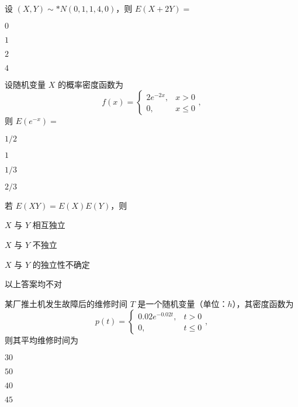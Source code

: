 \documentclass{exam-zh}
\begin{document}
\begin{question}
  设 $(X, Y) \sim* N(0, 1, 1, 4, 0)$，则 $E(X+2Y) =$ \paren[C]
  \begin{choices}
    \item $0$
    \item $1$
    \item $2$
    \item $4$
  \end{choices}
\end{question}

\begin{question}
  设随机变量 $X$ 的概率密度函数为
  $$
  f(x) = 
  \begin{cases} 
  2e^{-2x}, & x > 0 \\ 
  0, & x \leq 0 
  \end{cases},
  $$
  则 $E(e^{-x}) =$ \paren[D]
  \begin{choices}
    \item $1/2$
    \item $1$
    \item $1/3$
    \item $2/3$
  \end{choices}
\end{question}

\begin{question}
  若 $E(XY) = E(X)E(Y)$，则 \paren[C]
  \begin{choices}
    \item $X$ 与 $Y$ 相互独立
    \item $X$ 与 $Y$ 不独立
    \item $X$ 与 $Y$ 的独立性不确定
    \item 以上答案均不对
  \end{choices}
\end{question}

\begin{question}
  某厂推土机发生故障后的维修时间 $T$ 是一个随机变量（单位：$h$），其密度函数为
  $$
  p(t) = 
  \begin{cases} 
  0.02e^{-0.02t}, & t > 0 \\ 
  0, & t \leq 0 
  \end{cases},
  $$
  则其平均维修时间为 \paren[B]
  \begin{choices}
    \item $30$
    \item $50$
    \item $40$
    \item $45$
  \end{choices}
\end{question}
\end{document}
